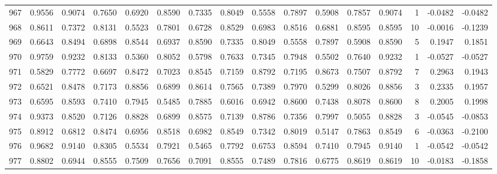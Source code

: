 \begin{tabular}{lrrrrrrrrrrrrrrr}
967 &      0.9556 &  0.9074 &  0.7650 &  0.6920 &  0.8590 &  0.7335 &  0.8049 &  0.5558 &  0.7897 &  0.5908 &   0.7857 &     0.9074 &      1 &                   -0.0482 &                    -0.0482 \\
968 &      0.8611 &  0.7372 &  0.8131 &  0.5523 &  0.7801 &  0.6728 &  0.8529 &  0.6983 &  0.8516 &  0.6881 &   0.8595 &     0.8595 &     10 &                   -0.0016 &                    -0.1239 \\
969 &      0.6643 &  0.8494 &  0.6898 &  0.8544 &  0.6937 &  0.8590 &  0.7335 &  0.8049 &  0.5558 &  0.7897 &   0.5908 &     0.8590 &      5 &                    0.1947 &                     0.1851 \\
970 &      0.9759 &  0.9232 &  0.8133 &  0.5360 &  0.8052 &  0.5798 &  0.7633 &  0.7345 &  0.7948 &  0.5502 &   0.7640 &     0.9232 &      1 &                   -0.0527 &                    -0.0527 \\
971 &      0.5829 &  0.7772 &  0.6697 &  0.8472 &  0.7023 &  0.8545 &  0.7159 &  0.8792 &  0.7195 &  0.8673 &   0.7507 &     0.8792 &      7 &                    0.2963 &                     0.1943 \\
972 &      0.6521 &  0.8478 &  0.7173 &  0.8856 &  0.6899 &  0.8614 &  0.7565 &  0.7389 &  0.7970 &  0.5299 &   0.8026 &     0.8856 &      3 &                    0.2335 &                     0.1957 \\
973 &      0.6595 &  0.8593 &  0.7410 &  0.7945 &  0.5485 &  0.7885 &  0.6016 &  0.6942 &  0.8600 &  0.7438 &   0.8078 &     0.8600 &      8 &                    0.2005 &                     0.1998 \\
974 &      0.9373 &  0.8520 &  0.7126 &  0.8828 &  0.6899 &  0.8575 &  0.7139 &  0.8786 &  0.7356 &  0.7997 &   0.5055 &     0.8828 &      3 &                   -0.0545 &                    -0.0853 \\
975 &      0.8912 &  0.6812 &  0.8474 &  0.6956 &  0.8518 &  0.6982 &  0.8549 &  0.7342 &  0.8019 &  0.5147 &   0.7863 &     0.8549 &      6 &                   -0.0363 &                    -0.2100 \\
976 &      0.9682 &  0.9140 &  0.8305 &  0.5534 &  0.7921 &  0.5465 &  0.7792 &  0.6753 &  0.8594 &  0.7410 &   0.7945 &     0.9140 &      1 &                   -0.0542 &                    -0.0542 \\
977 &      0.8802 &  0.6944 &  0.8555 &  0.7509 &  0.7656 &  0.7091 &  0.8555 &  0.7489 &  0.7816 &  0.6775 &   0.8619 &     0.8619 &     10 &                   -0.0183 &                    -0.1858 \\

\end{tabular}
